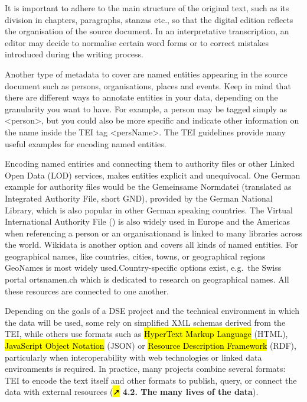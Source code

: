 \documentclass[
  letterpaper,
  DIV=11,
  numbers=noendperiod]{scrreprt}
\begin{document}
It is important to adhere to the main structure of the original text,
such as its division in chapters, paragraphs, stanzas etc., so that the
digital edition reflects the organisation of the source document. In an
interpretative transcription, an editor may decide to normalise certain
word forms or to correct mistakes introduced during the writing process.

Another type of metadata to cover are named entities appearing in the
source document such as persons, organisations, places and events. Keep
in mind that there are different ways to annotate entities in your data,
depending on the granularity you want to have. For example, a person may
be tagged simply as \textless person\textgreater, but you could also be
more specific and indicate other information on the name inside the TEI
tag \textless persName\textgreater. The TEI guidelines provide many
useful examples for encoding named entities.

Encoding named entiries and connecting them to authority files or other
Linked Open Data (LOD) services, makes entities explicit and
unequivocal. One German example for authority files would be the
Gemeinsame Normdatei (translated as Integrated Authority File, short
GND), provided by the German National Library, which is also popular in
other German speaking countries. The Virtual International Authority
File () is also widely used in Europe and the Americas when referencing
a person or an organisationand is linked to many libraries across the
world. Wikidata is another option and covers all kinds of named
entities. For geographical names, like countries, cities, towns, or
geographical regions GeoNames is most widely used.Country-specific
options exist, e.g.~the Swiss portal ortsnamen.ch which is dedicated to
research on geographical names. All these resources are connected to one
another.

Depending on the goals of a DSE project and the technical environment in
which the data will be used, some rely on simplified XML schemas derived
from the TEI, while others use formats such as \hl{HyperText Markup
Language} (HTML), \hl{JavaScript Object Notation} (JSON) or \hl{Resource
Description Framework} (RDF), particularly when interoperability with
web technologies or linked data environments is required. In practice,
many projects combine several formats: TEI to encode the text itself and
other formats to publish, query, or connect the data with external
resources (\hl{➚} \textbf{4.2. The many lives of the data}).
\end{document}
